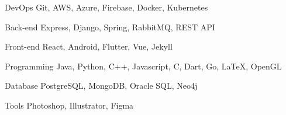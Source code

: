 

\begin{cvskills}

  \cvskill
    {DevOps} %
    {Git, AWS, Azure, Firebase, Docker, Kubernetes} %

  \cvskill
    {Back-end} %
    {Express, Django, Spring, RabbitMQ, REST API} %

  \cvskill
    {Front-end} %
    {React, Android, Flutter, Vue, Jekyll} %

  \cvskill
    {Programming} %
    {Java, Python, C++, Javascript, C, Dart, Go, LaTeX, OpenGL} %

  \cvskill
    {Database} %
    {PostgreSQL, MongoDB, Oracle SQL, Neo4j} %

  \cvskill
    {Tools} %
    {Photoshop, Illustrator, Figma} %
    
\end{cvskills}
